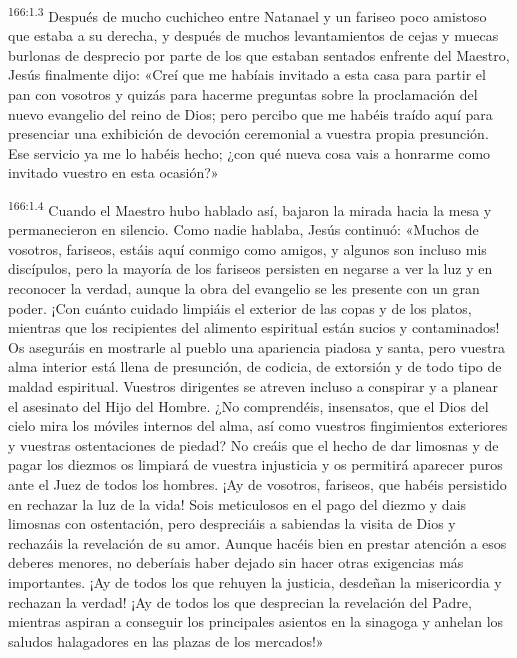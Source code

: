 \par 
\textsuperscript{166:1.3} Después de mucho cuchicheo entre Natanael y un fariseo poco amistoso que estaba a su derecha, y después de muchos levantamientos de cejas y muecas burlonas de desprecio por parte de los que estaban sentados enfrente del Maestro, Jesús finalmente dijo: «Creí que me habíais invitado a esta casa para partir el pan con vosotros y quizás para hacerme preguntas sobre la proclamación del nuevo evangelio del reino de Dios; pero percibo que me habéis traído aquí para presenciar una exhibición de devoción ceremonial a vuestra propia presunción. Ese servicio ya me lo habéis hecho; ¿con qué nueva cosa vais a honrarme como invitado vuestro en esta ocasión?»

\par 
\textsuperscript{166:1.4} Cuando el Maestro hubo hablado así, bajaron la mirada hacia la mesa y permanecieron en silencio. Como nadie hablaba, Jesús continuó: «Muchos de vosotros, fariseos, estáis aquí conmigo como amigos, y algunos son incluso mis discípulos, pero la mayoría de los fariseos persisten en negarse a ver la luz y en reconocer la verdad, aunque la obra del evangelio se les presente con un gran poder. ¡Con cuánto cuidado limpiáis el exterior de las copas y de los platos, mientras que los recipientes del alimento espiritual están sucios y contaminados! Os aseguráis en mostrarle al pueblo una apariencia piadosa y santa, pero vuestra alma interior está llena de presunción, de codicia, de extorsión y de todo tipo de maldad espiritual. Vuestros dirigentes se atreven incluso a conspirar y a planear el asesinato del Hijo del Hombre. ¿No comprendéis, insensatos, que el Dios del cielo mira los móviles internos del alma, así como vuestros fingimientos exteriores y vuestras ostentaciones de piedad? No creáis que el hecho de dar limosnas y de pagar los diezmos os limpiará de vuestra injusticia y os permitirá aparecer puros ante el Juez de todos los hombres. ¡Ay de vosotros, fariseos, que habéis persistido en rechazar la luz de la vida! Sois meticulosos en el pago del diezmo y dais limosnas con ostentación, pero despreciáis a sabiendas la visita de Dios y rechazáis la revelación de su amor. Aunque hacéis bien en prestar atención a esos deberes menores, no deberíais haber dejado sin hacer otras exigencias más importantes. ¡Ay de todos los que rehuyen la justicia, desdeñan la misericordia y rechazan la verdad! ¡Ay de todos los que desprecian la revelación del Padre, mientras aspiran a conseguir los principales asientos en la sinagoga y anhelan los saludos halagadores en las plazas de los mercados!»

